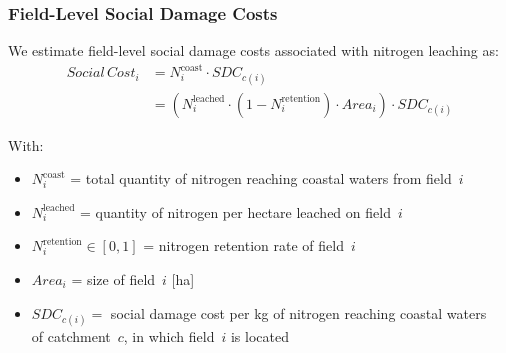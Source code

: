 \documentclass[t,24pt,aspectratio=169]{beamer}
\begin{document}
    


    


\begin{frame}[hvid]

\frametitle{\vspace{-3ex}Field-Level Social Damage Costs}
We estimate field-level social damage costs associated with nitrogen leaching as:
\vspace{1ex}
\begin{align*}
    Social \, Cost_i & =  N^{\text{coast}}_i  \cdot SDC_{c(i)}\\
    & = \left( N^{\text{leached}}_i \cdot \left(1 - N^{\text{retention}}_i\right) \cdot Area_i \right) \cdot SDC_{c(i)}
\end{align*}
\vspace{-3ex}

With:
\begin{itemize}
\setlength{\itemsep}{1ex}
\item $N^{\text{coast}}_i$ = total quantity of nitrogen reaching coastal waters from field~$i$

\item $N^{\text{leached}}_i$ = quantity of nitrogen per hectare leached on field~$i$

\item $N^{\text{retention}}_i \in [0,1]$ = nitrogen retention rate of field~$i$ %

\item $Area_i$ = size of field~$i$ [ha]

\item $SDC_{c(i)} =$ social damage cost per kg of nitrogen reaching coastal waters\\
\qquad\qquad of catchment~$c$, in which field~$i$ is located
\end{itemize}
\end{frame}
\end{document}
